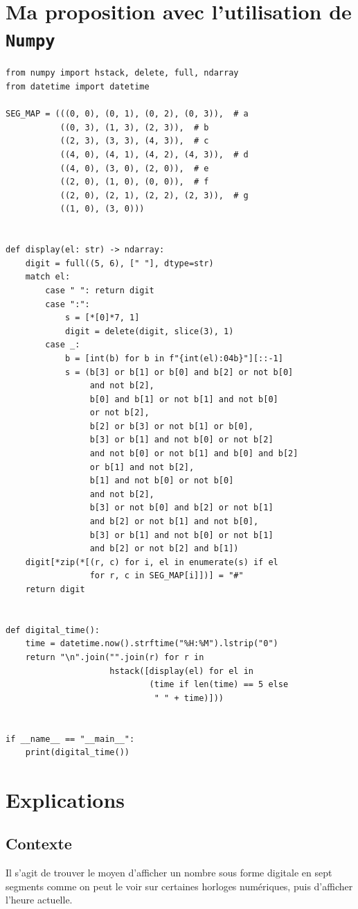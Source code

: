 \section{Ma proposition avec l'utilisation de \texttt{Numpy}}
\begin{lstlisting}
from numpy import hstack, delete, full, ndarray
from datetime import datetime

SEG_MAP = (((0, 0), (0, 1), (0, 2), (0, 3)),  # a
           ((0, 3), (1, 3), (2, 3)),  # b
           ((2, 3), (3, 3), (4, 3)),  # c
           ((4, 0), (4, 1), (4, 2), (4, 3)),  # d
           ((4, 0), (3, 0), (2, 0)),  # e
           ((2, 0), (1, 0), (0, 0)),  # f
           ((2, 0), (2, 1), (2, 2), (2, 3)),  # g
           ((1, 0), (3, 0)))


def display(el: str) -> ndarray:
    digit = full((5, 6), [" "], dtype=str)
    match el:
        case " ": return digit
        case ":":
            s = [*[0]*7, 1]
            digit = delete(digit, slice(3), 1)
        case _:
            b = [int(b) for b in f"{int(el):04b}"][::-1]
            s = (b[3] or b[1] or b[0] and b[2] or not b[0]
                 and not b[2],
                 b[0] and b[1] or not b[1] and not b[0]
                 or not b[2],
                 b[2] or b[3] or not b[1] or b[0],
                 b[3] or b[1] and not b[0] or not b[2]
                 and not b[0] or not b[1] and b[0] and b[2]
                 or b[1] and not b[2],
                 b[1] and not b[0] or not b[0]
                 and not b[2],
                 b[3] or not b[0] and b[2] or not b[1]
                 and b[2] or not b[1] and not b[0],
                 b[3] or b[1] and not b[0] or not b[1]
                 and b[2] or not b[2] and b[1])
    digit[*zip(*[(r, c) for i, el in enumerate(s) if el
                 for r, c in SEG_MAP[i]])] = "#"
    return digit


def digital_time():
    time = datetime.now().strftime("%H:%M").lstrip("0")
    return "\n".join("".join(r) for r in
                     hstack([display(el) for el in
                             (time if len(time) == 5 else 
                              " " + time)]))


if __name__ == "__main__":
    print(digital_time())
\end{lstlisting}
\medskip

\section{Explications}
\subsection*{Contexte}
Il s'agit de trouver le moyen d'afficher un nombre sous forme digitale en sept segments comme on peut le voir sur certaines horloges numériques, puis d'afficher l'heure actuelle.
\medskip

